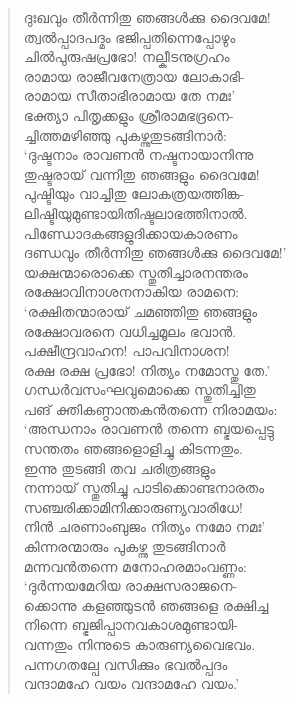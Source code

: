 \begin{verse}
ദുഃഖവും തീര്‍ന്നിതു ഞങ്ങള്‍ക്കു ദൈവമേ!\\
ത്വല്‍പ്പാദപദ്മം ഭജിപ്പതിന്നെപ്പോഴും\\
ചില്‍പുരുഷപ്രഭോ! നല്കീടനുഗ്രഹം\\
രാമായ രാജീവനേത്രായ ലോകാഭി-\\
രാമായ സീതാഭിരാമായ തേ നമഃ’\\
ഭക്ത്യാ പിതൃക്കളും ശ്രീരാമഭദ്രനെ-\\
ച്ചിത്തമഴിഞ്ഞു പുകഴ്ന്നുതുടങ്ങിനാര്‍:\\
‘ദുഷ്ടനാം രാവണന്‍ നഷ്ടനായാനിന്നു\\
തുഷ്ടരായ് വന്നിതു ഞങ്ങളും ദൈവമേ!\\
പുഷ്ടിയും വാച്ചിതു ലോകത്രയത്തിങ്ക-\\
ലിഷ്ടിയുമുണ്ടായിതിഷ്ടലാഭത്തിനാല്‍.\\
പിണ്ഡോദകങ്ങളുദിക്കായകാരണം\\
ദണ്ഡവും തീര്‍ന്നിതു ഞങ്ങള്‍ക്കു ദൈവമേ!’\\
യക്ഷന്മാരൊക്കെ സ്തുതിച്ചാരനന്തരം\\
രക്ഷോവിനാശനനാകിയ രാമനെ:\\
‘രക്ഷിതന്മാരായ് ചമഞ്ഞിതു ഞങ്ങളും\\
രക്ഷോവരനെ വധിച്ചമൂലം ഭവാന്‍.\\
പക്ഷീന്ദ്രവാഹന! പാപവിനാശന!\\
രക്ഷ രക്ഷ പ്രഭോ! നിത്യം നമോസ്തു തേ.’\\
ഗന്ധര്‍വസംഘവുമൊക്കെ സ്തുതിച്ചിതു\\
പങ് ക്തികണ്ഠാന്തകന്‍തന്നെ നിരാമയം:\\
‘അന്ധനാം രാവണന്‍ തന്നെ ബ്ഭയപ്പെട്ടു\\
സന്തതം ഞങ്ങളൊളിച്ചു കിടന്നതും.\\
ഇന്നു തുടങ്ങി തവ ചരിത്രങ്ങളും\\
നന്നായ് സ്തുതിച്ചു പാടിക്കൊണ്ടനാരതം\\
സഞ്ചരിക്കാമിനിക്കാരുണ്യവാരിധേ!\\
നിന്‍ ചരണാംബുജം നിത്യം നമോ നമഃ’\\
കിന്നരന്മാരും പുകഴ്ന്നു തുടങ്ങിനാര്‍\\
മന്നവന്‍തന്നെ മനോഹരമാംവണ്ണം:\\
‘ദുര്‍ന്നയമേറിയ രാക്ഷസരാജനെ-\\
ക്കൊന്നു കളഞ്ഞുടന്‍ ഞങ്ങളെ രക്ഷിച്ച\\
നിന്നെ ബ്ഭജിപ്പാനവകാശമുണ്ടായി-\\
വന്നതും നിന്നുടെ കാരുണ്യവൈഭവം.\\
പന്നഗതല്പേ വസിക്കും ഭവല്‍പ്പദം\\
വന്ദാമഹേ വയം വന്ദാമഹേ വയം.’\\

\end{verse}
